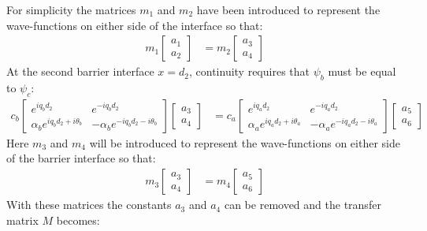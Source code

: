 			For simplicity the matrices $m_{1}$ and $m_{2}$ have been introduced to represent the wave-functions on either side of the interface so that:
			\begin{align}
				m_{1}\left[\begin{array}{ccc}
					a_{1}\\
					a_{2}
				\end{array}\right]
				&=
				m_{2}\left[\begin{array}{ccc}
					a_{3}\\
					a_{4}
				\end{array}\right]
			\end{align}
			At the second barrier interface $x=d_{2}$, continuity requires that $\psi_{b}$ must be equal to $\psi_{c}$:
			\begin{align}
				c_{b}
				\left[\begin{array}{ccc}
					e^{iq_{b}d_{2}}&e^{-iq_{b}d_{2}}\\
					\alpha_{b}e^{iq_{b}d_{2}+i\theta_{b}}&-\alpha_{b}e^{-iq_{b}d_{2}-i\theta_{b}}
				\end{array}\right]
				\left[\begin{array}{ccc}
					a_{3}\\
					a_{4}
				\end{array}\right]
				&=
				c_{a}
				\left[\begin{array}{ccc}
					e^{iq_{a}d_{2}}&e^{-iq_{a}d_{2}}\\
					\alpha_{a}e^{iq_{a}d_{2}+i\theta_{a}}&-\alpha_{a}e^{-iq_{a}d_{2}-i\theta_{a}}
				\end{array}\right]
				\left[\begin{array}{ccc}
					a_{5}\\
					a_{6}
				\end{array}\right]
			\end{align}
			Here $m_{3}$ and $m_{4}$ will be introduced to represent the wave-functions on either side of the barrier interface so that:
			\begin{align}
				m_{3}\left[\begin{array}{ccc}
					a_{3}\\
					a_{4}
				\end{array}\right]
				&=
				m_{4}\left[\begin{array}{ccc}
					a_{5}\\
					a_{6}
				\end{array}\right]
			\end{align}
			With these matrices the constants $a_{3}$ and $a_{4}$ can be removed and the transfer matrix $M$ becomes:
